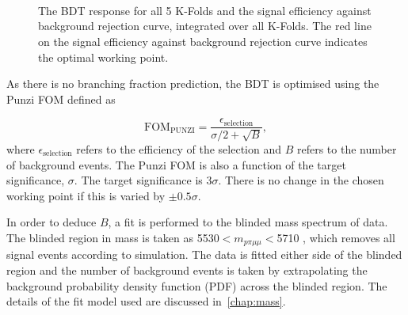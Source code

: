 \begin{figure}[!t]\def\nh{0.3\textwidth}
  \centering



   \textwidth
   \\
  \textwidth
     \\
   \textwidth
  \\


 \caption{The BDT response for all 5 K-Folds and the signal efficiency against background rejection curve, integrated over all K-Folds. The red line on the signal efficiency against background rejection curve indicates the optimal working point.}
  \label{Fig:kfoldBDT}

\end{figure}


As there is no branching fraction prediction, the BDT is optimised using the Punzi \gls{FOM} \cite{Punzi:2003bu} defined as

\begin{equation}
  \mathrm{FOM}_{\mathrm{PUNZI}} = \frac{\epsilon_{\mathrm{selection}}}{\sigma/2  + \sqrt{B}},
  \label{eq:punz}
\end{equation}
where $\epsilon_{\mathrm{selection}}$ refers to the efficiency of the selection and $B$ refers to the number of background events.
The Punzi FOM is also a function of the target significance, $\sigma$. The target significance is 3$\sigma$. There is no change in the chosen working point if this is varied by $\pm0.5\sigma$. %

In order to deduce $B$, a fit is performed to the blinded mass spectrum of \Lbpi data. The blinded region in mass is taken as 5530$<m_{p\pi\mu\mu}<$5710 \mevcc, which removes all signal events according to simulation. The data is fitted either side of the blinded region and the number of background events is taken by extrapolating the background probability density function (PDF) across the blinded region. The details of the fit model used are discussed in~\autoref{chap:mass}.

